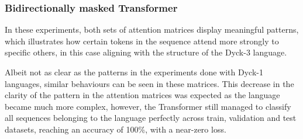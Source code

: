 \subsubsection{Bidirectionally masked Transformer}
In these experiments, both sets of attention matrices display meaningful patterns, which illustrates how certain tokens in the sequence attend more strongly to specific others, in this case aligning with the structure of the Dyck-3 language. 

Albeit not as clear as the patterns in the experiments done with Dyck-1 languages, similar behaviours can be seen in these matrices. This decrease in the clarity of the pattern in the attention matrices was expected as the language became much more complex, however, the Transformer still managed to classify all sequences belonging to the language perfectly across train, validation and test datasets, reaching an accuracy of 100\%, with a near-zero loss.

